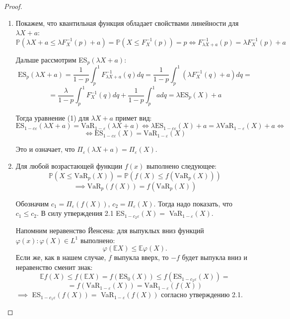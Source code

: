 \documentclass[12pt]{article}
\theoremstyle{plain}
\theoremstyle{definition}
\theoremstyle{remark}
\begin{document}
\begin{proof}
\text{}
\begin{enumerate}[label=(\roman*):, font=\textit]
    \item Покажем, что квантильная функция обладает свойствами линейности для $\lambda X + a$:
    \[
        \mathbb{P}(\lambda X + a \leq \lambda F_X^{-1}(p) + a) = \mathbb{P}(X\leq F_X^{-1}(p)) = p  \iff F_{\lambda X + a}^{-1}(p) = \lambda F_X^{-1}(p) + a
    \]

    Дальше рассмотрим ES$_p(\lambda X + a)$:
    \[
        \text{ES}_p(\lambda X + a) = \frac{1}{1-p}\int_p^1F_{\lambda X + a}^{-1}(q)dq = \frac{1}{1-p}\int_p^1(\lambda F_X^{-1}(q) + a)dq =  
    \]
    \[
         = \frac{\lambda}{1-p}\int_p^1 F_X^{-1}(q)dq + \frac{1}{1-p}\int_p^1adq = \lambda \text{ES}_p(X) + a
    \]

    Тогда уравнение (1) для $\lambda X + a$ примет вид:
    \[
        \text{ES}_{1-c\varepsilon}(\lambda X + a) = \text{VaR}_{1-\varepsilon}(\lambda X + a) \iff \lambda \text{ES}_{1-c\varepsilon}(X) + a = \lambda \text{VaR}_{1-\varepsilon}(X) + a \iff
    \]
    \[
        \iff \text{ES}_{1-c\varepsilon}(X) = \text{VaR}_{1-\varepsilon}(X)
    \]
    
    Это и означает, что $\Pi_\varepsilon(\lambda X + a) = \Pi_\varepsilon(X)$.

    \item
    Для любой возрастающей функции $f(x)$ выполнено следующее:
    \[
        \mathbb{P}(X\leq\text{VaR}_p(X)) = \mathbb{P}(f(X) \leq f(\text{VaR}_p(X))) 
    \]
    \[
        \implies \text{VaR}_p(f(X))= f(\text{VaR}_p(X))
    \]

    Обозначим $c_1 = \Pi_\varepsilon(f(X))$, $c_2 = \Pi_\varepsilon(X)$. Тогда надо показать, что $c_1 \leq c_2$. В силу утверждения 2.1 ES$_{1-c_2\varepsilon}(X)=$ VaR$_{1-\varepsilon}(X)$.

    Напомним неравенство Йенсена: для выпуклых вниз функций $\varphi(x) : \varphi(X) \in L^1$ выполнено:
    \[
        \varphi(\mathbb{E}X)\leq \mathbb{E}\varphi(X).
    \]
    Если же, как  в нашем случае, $f$ выпукла вверх, то $-f$ будет выпукла вниз и неравенство сменит знак:
    \begin{equation*}
        \mathbb{E}f(X) \leq f(\mathbb{E}X) = f(\text{ES}_0(X)) \leq f(\text{ES}_{1-c_2\varepsilon}(X)) =
    \end{equation*}
    \[
        =f(\text{VaR}_{1-\varepsilon}(X)) = \text{VaR}_{1-\varepsilon}(f(X))
    \]
    $\implies$ ES$_{1-c_1\varepsilon}(f(X))=$ VaR$_{1-\varepsilon}(f(X))$ согласно утверждению 2.1.


\end{enumerate}
\end{proof}
\end{document}
